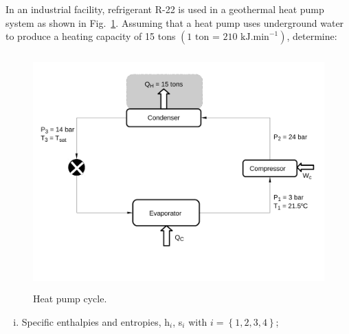 \documentclass[calculator,steamtables,refrigeranttables,psychrometricchart,datasheet,resit]{exam}
\begin{document}
\begin{question}

In an industrial facility, refrigerant R-22 is used in a geothermal heat pump system as shown in Fig.~\ref{Exam01_Prob4}. Assuming that a heat pump uses underground water to produce a heating capacity of 15 tons $\left(\text{1 ton = 210 kJ.min}^{-1}\right)$, determine:
\begin{figure}[!h]
\begin{center}
\includegraphics[width=12.0cm,height=9.0cm]{./Pics/Exam_Refrigeration14-15}
\end{center}
\vspace{-1.8cm}
\caption{Heat pump cycle.}\label{Exam01_Prob4}
\end{figure}
\begin{enumerate}[(i)]
 \item Specific enthalpies and entropies, h$_{i}$, s$_{i}$ with $i=\left\{1,2,3,4\right\}$;~
\end{enumerate}
\end{question}
\end{document}
